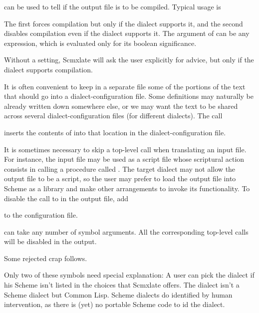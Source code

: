 
 can be used to tell if the output
file is to be compiled.  Typical usage is


\n The first forces compilation but only if the dialect
supports it, and the second disables compilation even
if the dialect supports it.  The argument of
 can be any expression, which is
evaluated only for its boolean significance.

Without a  setting, Scmxlate will
ask the user explicitly for advice, but only if
the dialect supports compilation.


It is often convenient to keep in a separate file some
of the portions of the text that should go into a
dialect-configuration file.  Some definitions may
naturally be already written down somewhere else, or
we may want the text to be shared across several
dialect-configuration files (for different dialects).
The call


\n inserts the contents of 
into that location in the dialect-configuration file.


It is sometimes necessary to skip a top-level
call when translating an input file.  For instance,
the input file may be used as a script file whose
scriptural action consists in calling a procedure
called .  The target dialect may not allow
the output file to be a script, so the user may prefer
to load the output file into Scheme as a library
and make other arrangements to invoke its
functionality.  To disable the call to 
in the output file, add


\n to the configuration file.

 can take any number of symbol
arguments.  All the corresponding top-level calls
will be disabled in the output.

\bye

Some rejected crap follows.

Only two of these symbols need special explanation: A
user can pick the  dialect if his Scheme isn't
listed in the choices that Scmxlate offers.  The
dialect  isn't a Scheme dialect but Common Lisp.
Scheme dialects do identified  by human
intervention, as there is (yet) no portable Scheme code
to id the dialect.

